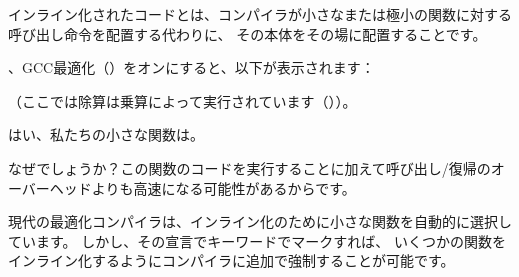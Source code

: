 \label{inline_code}

インライン化されたコードとは、コンパイラが小さなまたは極小の関数に対する呼び出し命令を配置する代わりに、
その本体をその場に配置することです。



、GCC最適化（\Othree）をオンにすると、以下が表示されます：



（ここでは除算は乗算によって実行されています（））。

はい、私たちの小さな関数は。

なぜでしょうか？この関数のコードを実行することに加えて呼び出し/復帰のオーバーヘッドよりも高速になる可能性があるからです。

現代の最適化コンパイラは、インライン化のために小さな関数を自動的に選択しています。
しかし、その宣言でキーワードでマークすれば、
いくつかの関数をインライン化するようにコンパイラに追加で強制することが可能です。

